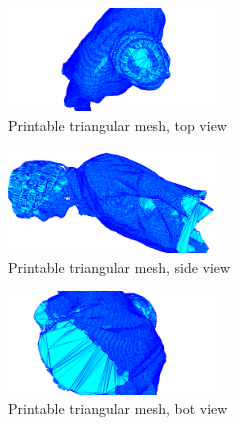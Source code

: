 \begin{figure}[ht!]
  \centering
    \includegraphics[width=0.49\textwidth]{figures/3dMesh_sundin_zoom_top.png}
    \caption{Printable triangular mesh, top view}
    \label{fig:sundin-top-zoom}
\end{figure}

\begin{figure}[ht!]
  \centering
    \includegraphics[width=0.49\textwidth]		{figures/3dMesh_sundin_zoom_side.png}
    \caption{Printable triangular mesh, side view}
    \label{fig:sundin-side-zoom}
\end{figure}

\begin{figure}[ht!]
  \centering
    \includegraphics[width=0.49\textwidth]{figures/3dMesh_sundin_zoom_bot.png}
    \caption{Printable triangular mesh, bot view}
    \label{fig:sundin-bot-zoom}
\end{figure}